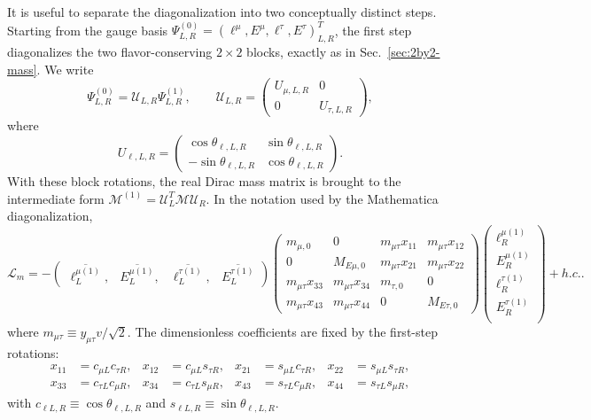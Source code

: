 \documentclass[onecolumn, aps, nofootinbib, prd, preprint, floats, floatfix, amsmath, amssymb, superscriptaddress, preprintnumbers]{revtex4-1}
\begin{document}
It is useful to separate the diagonalization into two conceptually distinct steps. Starting from the gauge basis \(\Psi^{(0)}_{L,R}=(\ell^\mu,E^\mu,\ell^\tau,E^\tau)_{L,R}^{T}\), the first step diagonalizes the two flavor-conserving \(2\times2\) blocks, exactly as in Sec.~\ref{sec:2by2-mass}. We write
\begin{equation}
\Psi^{(0)}_{L,R}=\mathcal{U}_{L,R}\Psi^{(1)}_{L,R},
\qquad
\mathcal{U}_{L,R}=
\begin{pmatrix}
U_{\mu,L,R} & 0\\
0 & U_{\tau,L,R}
\end{pmatrix},
\label{eq:ymutau-first-rotation}
\end{equation}
where
\begin{equation}
U_{\ell,L,R}=
\begin{pmatrix}
\cos\theta_{\ell,L,R} & \sin\theta_{\ell,L,R}\\
-\sin\theta_{\ell,L,R} & \cos\theta_{\ell,L,R}
\end{pmatrix}.
\end{equation}
With these block rotations, the real Dirac mass matrix is brought to the intermediate form \(\mathcal{M}^{(1)}=\mathcal{U}_L^T\mathcal{M}\mathcal{U}_R\). In the notation used by the Mathematica diagonalization,
\begin{equation}
\mathcal{L}_m=-
\begin{pmatrix}
	\overline{\ell^{\mu(1)}_L},  &
	\overline{E^{\mu(1)}_L}, &
	\overline{\ell^{\tau(1)}_L}, &
	\overline{E^{\tau(1)}_L}
\end{pmatrix}
\begin{pmatrix}
	m_{\mu,0} & 0  & m_{\mu\tau} x_{11} & m_{\mu\tau} x_{12} \\
	0 & M_{E\mu,0} & m_{\mu\tau} x_{21} & m_{\mu\tau} x_{22}\\
	m_{\mu\tau} x_{33} & m_{\mu\tau} x_{34} & m_{\tau,0} &0\\
    m_{\mu\tau} x_{43} & m_{\mu\tau} x_{44} &  0 & M_{E\tau,0}
\end{pmatrix}
\begin{pmatrix}
	\ell^{\mu(1)}_R \\
	E^{\mu(1)}_R \\
	\ell^{\tau(1)}_R \\
	E^{\tau(1)}_R \\
\end{pmatrix}
+h.c. .
\label{eq:4by4-mass-mutau-v1}
\end{equation}
where \(m_{\mu\tau}\equiv y_{\mu\tau}v/\sqrt2\). The dimensionless coefficients are fixed by the first-step rotations:
\begin{align}
x_{11}&=c_{\mu L}c_{\tau R},&
x_{12}&=c_{\mu L}s_{\tau R},&
x_{21}&=s_{\mu L}c_{\tau R},&
x_{22}&=s_{\mu L}s_{\tau R},\nonumber\\
x_{33}&=c_{\tau L}c_{\mu R},&
x_{34}&=c_{\tau L}s_{\mu R},&
x_{43}&=s_{\tau L}c_{\mu R},&
x_{44}&=s_{\tau L}s_{\mu R},
\label{eq:ymutau-xij}
\end{align}
with \(c_{\ell L,R}\equiv\cos\theta_{\ell,L,R}\) and \(s_{\ell L,R}\equiv\sin\theta_{\ell,L,R}\).
\end{document}
